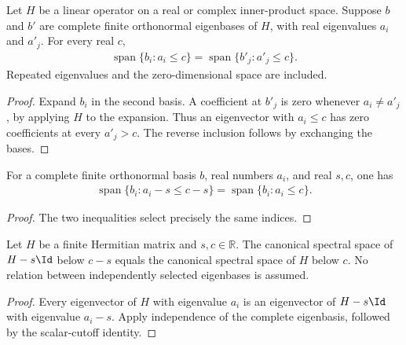 \begin{lemma}
    \label{lem:closed_spectral_basis_independence}
    \leanok
    Let $H$ be a linear operator on a real or complex inner-product space.
    Suppose $b$ and $b'$ are complete finite orthonormal eigenbases of $H$,
    with real eigenvalues $a_i$ and $a'_j$. For every real $c$,
    \begin{align*}
      \operatorname{span}\{b_i:a_i\le c\}
       =\operatorname{span}\{b'_j:a'_j\le c\}.
    \end{align*}
    Repeated eigenvalues and the zero-dimensional space are included.
\end{lemma}
\begin{proof}
    \leanok
    Expand $b_i$ in the second basis. A coefficient at $b'_j$ is zero
    whenever $a_i\ne a'_j$, by applying $H$ to the expansion. Thus an
    eigenvector with $a_i\le c$ has zero coefficients at every $a'_j>c$.
    The reverse inclusion follows by exchanging the bases.
\end{proof}

\begin{lemma}
    \label{lem:closed_spectral_scalar_shift}
    \leanok
    For a complete finite orthonormal basis $b$, real numbers $a_i$, and
    real $s,c$, one has
    \begin{align*}
      \operatorname{span}\{b_i:a_i-s\le c-s\}
        =\operatorname{span}\{b_i:a_i\le c\}.
    \end{align*}
\end{lemma}
\begin{proof}
    \leanok
    The two inequalities select precisely the same indices.
\end{proof}

\begin{theorem}
    \label{thm:canonical_spectral_scalar_shift}
    \leanok
    Let $H$ be a finite Hermitian matrix and $s,c\in\mathbb R$.
    The canonical spectral space of $H-s\Id$ below $c-s$ equals the
    canonical spectral space of $H$ below $c$. No relation between
    independently selected eigenbases is assumed.
\end{theorem}
\begin{proof}
    \leanok
    Every eigenvector of $H$ with eigenvalue $a_i$ is an eigenvector of
    $H-s\Id$ with eigenvalue $a_i-s$. Apply independence of the complete
    eigenbasis, followed by the scalar-cutoff identity.
\end{proof}

